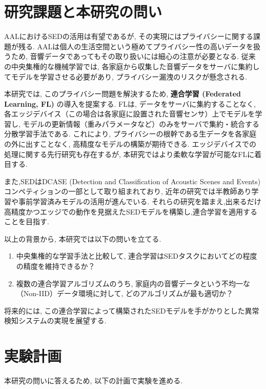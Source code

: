 \documentclass[dvipdfmx, twocolumn, 10pt]{bxjsarticle}
\begin{document}
\section{研究課題と本研究の問い}
AALにおけるSEDの活用は有望であるが, その実現にはプライバシーに関する課題が残る. 
AALは個人の生活空間という極めてプライバシー性の高いデータを扱うため, 音響データであってもその取り扱いには細心の注意が必要となる. 
従来の中央集権的な機械学習では, 各家庭から収集した音響データをサーバに集約してモデルを学習させる必要があり, プライバシー漏洩のリスクが懸念される.

本研究では, このプライバシー問題を解決するため, \textbf{連合学習 (Federated Learning, FL)} の導入を提案する. 
FLは, データをサーバに集約することなく, 各エッジデバイス（この場合は各家庭に設置された音響センサ）上でモデルを学習し, モデルの更新情報（重みパラメータなど）のみをサーバで集約・統合する分散学習手法である. 
これにより, プライバシーの根幹である生データを各家庭の外に出すことなく, 高精度なモデルの構築が期待できる. 
エッジデバイスでの処理に関する先行研究\cite{alsina2017homesound}も存在するが, 本研究ではより柔軟な学習が可能なFLに着目する.

また,SEDはDCASE (Detection and Classification of Acoustic Scenes and Events) コンペティションの一部として取り組まれており, 近年の研究では半教師あり学習や事前学習済みモデルの活用が進んでいる\cite{cornell2024dcase,yue2024local,son2024sound}.
それらの研究を踏まえ,出来るだけ高精度かつエッジでの動作を見据えたSEDモデルを構築し,連合学習を適用することを目指す.


以上の背景から, 本研究では以下の問いを立てる.
\begin{enumerate}
    \item 中央集権的な学習手法と比較して, 連合学習はSEDタスクにおいてどの程度の精度を維持できるか？
    \item 複数の連合学習アルゴリズムのうち, 家庭内の音響データという不均一な（Non-IID）データ環境に対して, どのアルゴリズムが最も適切か？
\end{enumerate}
将来的には, この連合学習によって構築されたSEDモデルを手がかりとした異常検知システムの実現を展望する.

\section{実験計画}
本研究の問いに答えるため, 以下の計画で実験を進める.
\end{document}
